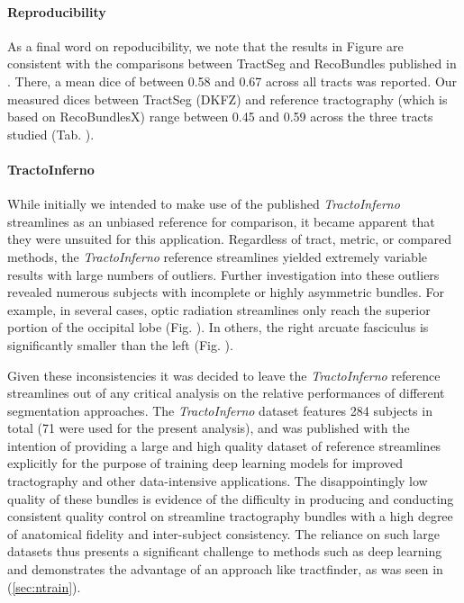 \paragraph*{Reproducibility}

As a final word on repoducibility, we note that the results in Figure  are consistent with the comparisons between TractSeg and RecoBundles published in \textcite{Wasserthal2018}.
There, a mean \gls{dice} of between 0.58 and 0.67 across all tracts was reported.
Our measured \gls{dice}s between TractSeg (DKFZ) and reference tractography (which is based on RecoBundlesX\autocite{Garyfallidis2018}) range between 0.45 and 0.59 across the three tracts studied (Tab. ).

\paragraph*{TractoInferno}


While initially we intended to make use of the published \textit{TractoInferno} streamlines as an unbiased reference for comparison, it became apparent that they were unsuited for this application.
Regardless of tract, metric, or compared methods, the \textit{TractoInferno} reference streamlines yielded extremely variable results with large numbers of outliers.
Further investigation into these outliers revealed numerous subjects with incomplete or highly asymmetric bundles.
For example, in several cases, optic radiation streamlines only reach the superior portion of the occipital lobe (Fig. ).
In others, the right arcuate fasciculus is significantly smaller than the left (Fig. ).

Given these inconsistencies it was decided to leave the \textit{TractoInferno} reference streamlines out of any critical analysis on the relative performances of different segmentation approaches.
The \textit{TractoInferno} dataset features 284 subjects in total (71 were used for the present analysis), and was published with the intention of providing a large and high quality dataset of reference streamlines explicitly for the purpose of training deep learning models for improved tractography and other data-intensive applications.
The disappointingly low quality of these bundles is evidence of the difficulty in producing and conducting consistent quality control on streamline tractography bundles with a high degree of anatomical fidelity and inter-subject consistency.
The reliance on such large datasets thus presents a significant challenge to methods such as deep learning and demonstrates the advantage of an approach like tractfinder, as was seen in (\ref{sec:ntrain}).

